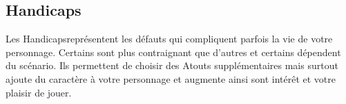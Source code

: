 \subsection{Handicaps}

Les Handicaps\footnotemark[1] représentent les défauts qui compliquent parfois la vie de votre personnage. Certains sont plus contraignant que d'autres et certains dépendent du scénario. Ils permettent de choisir des Atouts supplémentaires mais surtout ajoute du caractère à votre personnage et augmente ainsi sont intérêt et votre plaisir de jouer.



